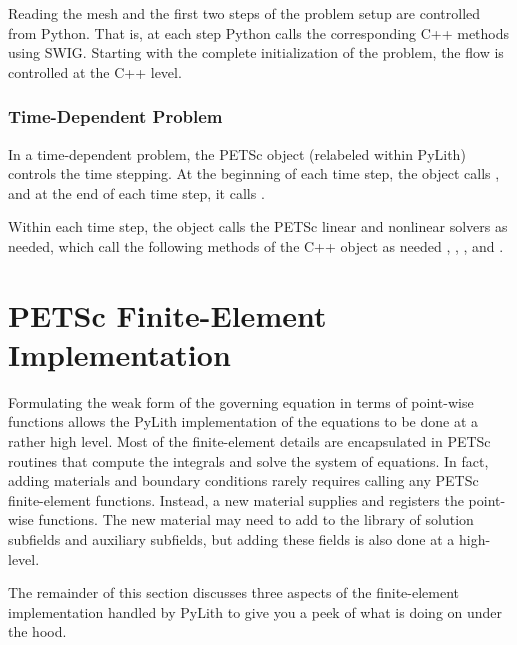 Reading the mesh and the first two steps of the problem setup are
controlled from Python. That is, at each step Python calls the
corresponding C++ methods using SWIG. Starting with the complete
initialization of the problem, the flow is controlled at the C++
level.

\subsubsection{Time-Dependent Problem}

In a time-dependent problem, the PETSc  object (relabeled
 within PyLith) controls the time stepping. At the
beginning of each time step, the  object calls
, and at the end of each
time step, it calls .

Within each time step, the  object calls the PETSc
linear and nonlinear solvers as needed, which call the following
methods of the C++  object as
needed
,
,
, and
.

\section{PETSc Finite-Element Implementation}

Formulating the weak form of the governing equation in terms of
point-wise functions allows the PyLith implementation of the equations
to be done at a rather high level. Most of the finite-element details
are encapsulated in PETSc routines that compute the integrals and
solve the system of equations. In fact, adding materials and boundary
conditions rarely requires calling any PETSc finite-element
functions. Instead, a new material supplies and registers the
point-wise functions. The new material may need to add to the library
of solution subfields and auxiliary subfields, but adding these fields
is also done at a high-level.

The remainder of this section discusses three aspects of the
finite-element implementation handled by PyLith to give you a peek of
what is doing on under the hood.

\subsection{}

